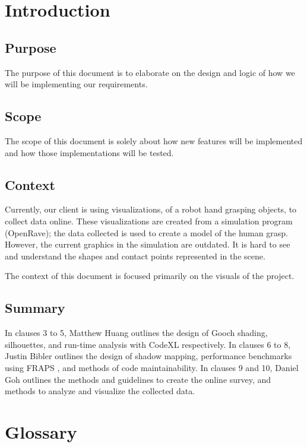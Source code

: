 \documentclass[10pt,journal,compsoc,draftclsnofoot]{IEEEtran}
\begin{document}
\section{Introduction}
\begin{flushleft}

\subsection{Purpose}
The purpose of this document is to elaborate on the design and logic of how we will be implementing our requirements.

\subsection{Scope}
The scope of this document is solely about how new features will be implemented and how those implementations will be tested.

\subsection{Context}
Currently, our client is using visualizations, of a robot hand grasping objects, to collect data online.
These visualizations are created from a simulation program (OpenRave); the data collected is used to create a model of the human grasp.
However, the current graphics in the simulation are outdated.
It is hard to see and understand the shapes and contact points represented in the scene.

The context of this document is focused primarily on the visuals of the project.

\subsection{Summary}
In clauses 3 to 5, Matthew Huang outlines the design of Gooch shading, silhouettes, and run-time analysis with CodeXL respectively.
In clauses 6 to 8, Justin Bibler outlines the design of shadow mapping, performance benchmarks using FRAPS \cite{fraps}, and methods of code maintainability.
In clauses 9 and 10, Daniel Goh outlines the methods and guidelines to create the online survey, and methods to analyze and visualize the collected data.

\newpage




\section{Glossary}


\end{flushleft}
\end{document}
